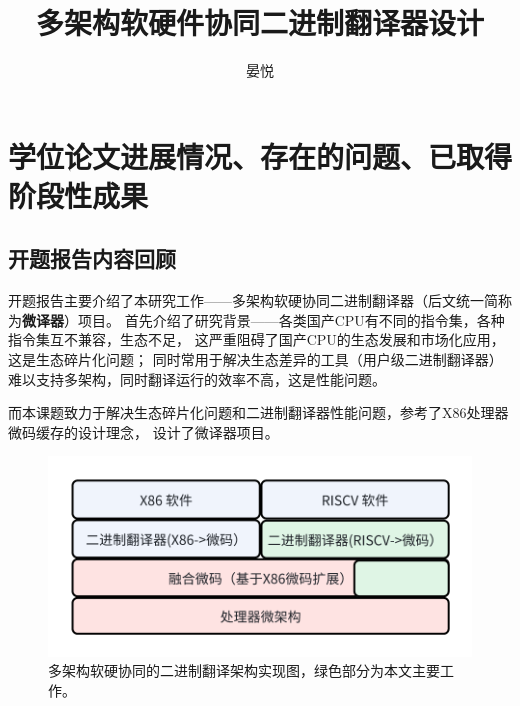 \documentclass{Style/ucasproposal}%
\title{多架构软硬件协同二进制翻译器设计}%
\author{晏悦}%
\institute{中国科学院计算技术研究所}%
\begin{document}

\maketitle%
\tableofcontents%
\clearpage
{}%

\section{学位论文进展情况、存在的问题、已取得阶段性成果}

\subsection{开题报告内容回顾}

开题报告主要介绍了本研究工作——多架构软硬协同二进制翻译器（后文统一简称为\textbf{微译器}）项目。
首先介绍了研究背景——各类国产CPU有不同的指令集，各种指令集互不兼容，生态不足，
这严重阻碍了国产CPU的生态发展和市场化应用，这是生态碎片化问题；
同时常用于解决生态差异的工具（用户级二进制翻译器）难以支持多架构，同时翻译运行的效率不高，这是性能问题。

而本课题致力于解决生态碎片化问题和二进制翻译器性能问题，参考了X86处理器微码缓存的设计理念，
设计了微译器项目。

\begin{figure}[h]
  \centering
  \includegraphics[width=0.8\linewidth]{./feishuImage/implement_arch.png}
  \caption{多架构软硬协同的二进制翻译架构实现图，绿色部分为本文主要工作。}
  \label{img:implement_arch}
\end{figure}
\end{document}
